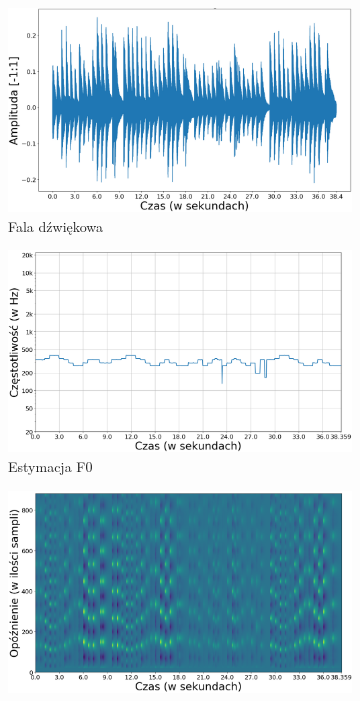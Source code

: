 \documentclass[12pt,a4paper,twoside]{mwart}
\begin{document}
\begin{figure}[t]
  \begin{subfigure}{.5\textwidth}
    \centering
    \includegraphics[width=1.\linewidth]{images/AC/fala_cropped.png}
    \caption{Fala dźwiękowa}
    \label{fig:ACResults:wave}
  \end{subfigure}%
  \begin{subfigure}{.5\textwidth}
    \centering
    \includegraphics[width=1.\linewidth]{images/AC/f0Thick_cropped.png}
    \caption{Estymacja F0}
    \label{fig:ACResults:f0}
  \end{subfigure}
  \newline
  \begin{subfigure}{1\textwidth}
    \centering
    \includegraphics[width=.6\linewidth]{images/AC/korelogram_cropped.png}  

\end{subfigure}
\end{figure}
\end{document}
